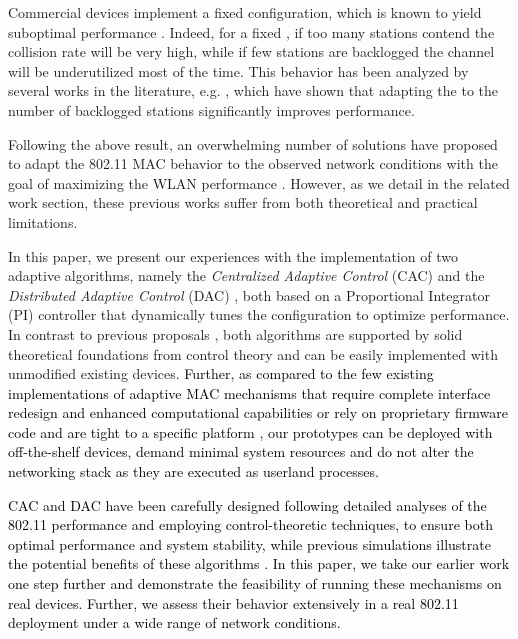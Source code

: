 \documentclass[a4paper,10pt]{article}
\newcommand{\revs}[1]{\textcolor{black}{#1}}
\begin{document}
Commercial devices implement a fixed  configuration, which is known to yield suboptimal performance \revs{\cite{bianchi00}}. Indeed, for a fixed , if too many stations contend the collision rate will be very high, while if few stations are backlogged the channel will be underutilized most of the time. This behavior has been analyzed by several works in the literature, e.g. \revs{\cite{bianchi00,comnet,tvt}}, which have shown that adapting the  to the number of backlogged stations significantly improves performance.

Following the above result, an overwhelming number of solutions have proposed to adapt the 802.11 MAC behavior to the observed network conditions with the goal of maximizing the WLAN performance \cite{freitag06,scalia06,nafaa05,yang07,xia06,ni03,slow05,slow10,heusse05,siris06, AOBimpl}. 
However, as we detail in the related work section, these previous works suffer from both theoretical and practical limitations.


In this paper, we present our experiences with the implementation of two adaptive algorithms, namely the \emph{Centralized Adaptive Control} (CAC) \cite{patras09monet} and the \emph{Distributed Adaptive Control} (DAC) \cite{patras10tmc}, both based on a Proportional Integrator (PI) controller that dynamically tunes the  configuration to optimize performance. In contrast to previous proposals \revs{\cite{freitag06,scalia06,nafaa05,yang07,xia06,ni03,slow05,slow10,heusse05,idle07, siris06, AOBimpl}}, both algorithms are supported by solid theoretical foundations from control theory and can be easily implemented with unmodified existing devices. \revs{Further, as compared to the few existing implementations of adaptive MAC mechanisms that require complete interface redesign and enhanced computational capabilities \cite{AOBimpl} or rely on proprietary firmware code and are tight to a specific platform \cite{idle07}, our prototypes can be deployed with off-the-shelf devices, demand minimal system resources and do not alter the networking stack as they are executed as userland processes.}

\revs{CAC and DAC have been carefully designed following detailed analyses of the 802.11 performance and employing control-theoretic techniques, to ensure both optimal performance and system stability, while previous simulations illustrate the potential benefits of these algorithms \cite{patras09monet,patras10tmc}. In this paper, we take our earlier work one step further and demonstrate the feasibility of running these mechanisms on real devices. Further, we assess their behavior extensively in a real 802.11 deployment under a wide range of network conditions.}
\end{document}
